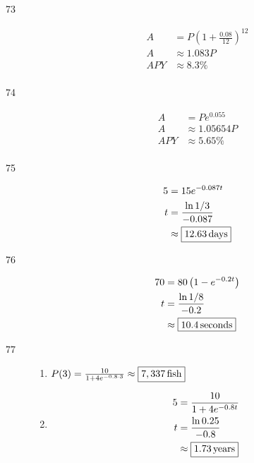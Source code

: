 \documentclass{exam}
\begin{document}
\begin{description}
      \item[73]
        \begin{align*}
          A   & = P \left( 1 + \frac{0.08}{12} \right)^{12} \\
          A   & \approx 1.083 P \\
          APY & \approx \boxed{8.3\%} \\
        \end{align*}

      \item[74]
        \begin{align*}
          A   & = P e^{0.055} \\
          A   & \approx 1.05654 P \\
          APY & \approx \boxed{5.65\%} \\
        \end{align*}

      \item[75]
        \begin{align*}
          5 &= 15 e^{-0.087t} \\
          t &= \frac{\ln 1/3}{-0.087} \\
            &\approx \boxed{\unit[12.63]{days}} \\
        \end{align*}

      \item[76]
        \begin{align*}
          70           & = 80 \left( 1 - e^{-0.2t} \right) \\
          t            & = \frac{\ln 1/8}{-0.2} \\
                       & \approx \boxed{\unit[10.4]{seconds}} \\
        \end{align*}

      \item[77]
        \begin{enumerate}[a]
          \item $P(3) = \frac{10}{1 + 4e^{-0.8 \cdot 3}} \approx \boxed{\unit[7,337]{fish}}$

          \item 
            \begin{align*}
              5 &= \frac{10}{1 + 4e^{-0.8t}} \\
              t &= \frac{\ln 0.25}{-0.8} \\
                &\approx \boxed{\unit[1.73]{years}} \\
            \end{align*}
        \end{enumerate}


\end{description}
\end{document}
